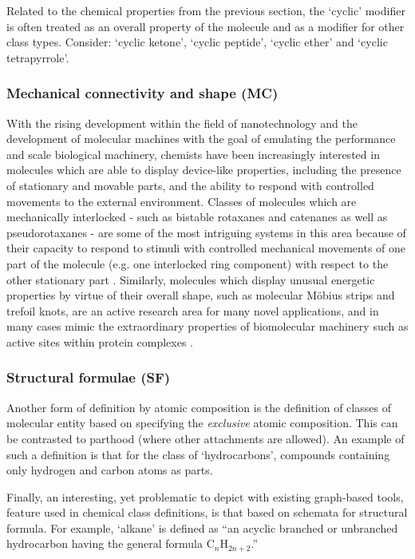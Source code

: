 \documentclass[10pt]{bmc_article}
\newenvironment{bmcformat}{\baselineskip20pt\sloppy\setboolean{publ}{false}}{\baselineskip20pt\sloppy}
\begin{document}
\begin{bmcformat}
Related to the chemical properties from the previous section, the `cyclic' modifier is often treated as an overall property of the molecule and as a modifier for other class types. Consider: `cyclic ketone', `cyclic peptide', %
 `cyclic ether' and `cyclic tetrapyrrole'.

\subsubsection*{Mechanical connectivity and shape (MC)}

With the rising development within the field of nanotechnology and the development of molecular machines with the goal of emulating the performance and scale biological machinery, chemists have been increasingly interested in molecules which are able to display device-like properties, including the presence of stationary and movable parts, and the ability to respond with controlled movements to the external environment. Classes of molecules which are mechanically interlocked  - such as bistable rotaxanes and catenanes as well as pseudorotaxanes - are some of the most intriguing systems in this area because of their capacity to respond to stimuli with controlled mechanical movements of one part of the molecule (e.g. one interlocked ring component) with respect to the other stationary part \cite{stoddart2011}.  Similarly, molecules which display unusual energetic properties by virtue of their overall shape, such as molecular M\"{o}bius strips and trefoil knots, are an active research area for many novel applications, and in many cases mimic the extraordinary properties of biomolecular machinery such as active sites within protein complexes \cite{rzepa2009a,rzepa2009b}.  



\subsubsection*{Structural formulae (SF)}
\label{sec:molformula}

Another form of definition by atomic composition is the definition of classes of molecular entity based on specifying the \textit{exclusive} atomic composition.  This can be contrasted to parthood (where other attachments are allowed).  An example of such a definition is that for the class of `hydrocarbons', compounds containing only hydrogen and carbon atoms as parts. 

Finally, an interesting, yet problematic to depict with existing graph-based tools, feature used in chemical class definitions, is that based on schemata for structural formula.  For example, `alkane' is defined as ``an acyclic branched or unbranched hydrocarbon having the general formula C$_{n}$H$_{2n+2}$.'' 


\end{bmcformat}
\end{document}
